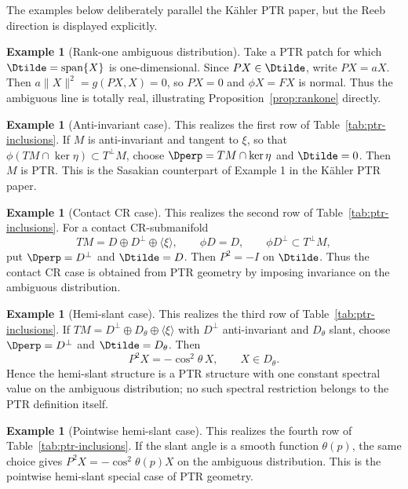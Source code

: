 \documentclass[11pt]{article}
\theoremstyle{definition}\newtheorem{definition}[theorem]{Definition}\newtheorem{example}[theorem]{Example}
\theoremstyle{remark}\newtheorem{remark}[theorem]{Remark}
\begin{document}
The examples below deliberately parallel the K\"ahler PTR paper, but the Reeb direction is displayed explicitly.

\begin{example}[Rank-one ambiguous distribution]\label{ex:rankone}
Take a PTR patch for which $\Dtilde=\operatorname{span}\{X\}$ is one-dimensional. Since $PX\in\Dtilde$, write $PX=aX$. Then $a\|X\|^2=g(PX,X)=0$, so $PX=0$ and $\phi X=FX$ is normal. Thus the ambiguous line is totally real, illustrating Proposition~\ref{prop:rankone} directly.
\end{example}

\begin{example}[Anti-invariant case]\label{ex:totallyreal}
This realizes the first row of Table~\ref{tab:ptr-inclusions}.  If $M$ is anti-invariant and tangent to $\xi$, so that $\phi(TM\cap\ker\eta)\subset T^\perp M$, choose $\Dperp=TM\cap\ker\eta$ and $\Dtilde=0$. Then $M$ is PTR. This is the Sasakian counterpart of Example 1 in the K\"ahler PTR paper.
\end{example}

\begin{example}[Contact CR case]\label{ex:cr}
This realizes the second row of Table~\ref{tab:ptr-inclusions}.  For a contact CR-submanifold
\[
 TM=D\oplus D^\perp\oplus\langle\xi\rangle,
 \qquad \phi D=D,\qquad \phi D^\perp\subset T^\perp M,
\]
put $\Dperp=D^\perp$ and $\Dtilde=D$. Then $P^2=-I$ on $\Dtilde$. Thus the contact CR case is obtained from PTR geometry by imposing invariance on the ambiguous distribution.
\end{example}

\begin{example}[Hemi-slant case]\label{ex:hemislant}
This realizes the third row of Table~\ref{tab:ptr-inclusions}.  If $TM=D^\perp\oplus D_\theta\oplus\langle\xi\rangle$ with $D^\perp$ anti-invariant and $D_\theta$ slant, choose $\Dperp=D^\perp$ and $\Dtilde=D_\theta$. Then
\[
 P^2X=-\cos^2\theta\,X,\qquad X\in D_\theta.
\]
Hence the hemi-slant structure is a PTR structure with one constant spectral value on the ambiguous distribution; no such spectral restriction belongs to the PTR definition itself.
\end{example}

\begin{example}[Pointwise hemi-slant case]\label{ex:pointwise}
This realizes the fourth row of Table~\ref{tab:ptr-inclusions}.  If the slant angle is a smooth function $\theta(p)$, the same choice gives
$P^2X=-\cos^2\theta(p)X$ on the ambiguous distribution. This is the pointwise hemi-slant special case of PTR geometry.
\end{example}
\end{document}
